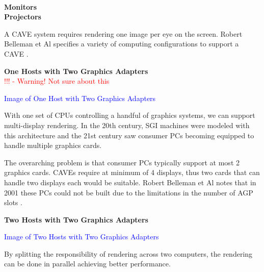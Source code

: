\label{chapter:standardCAVEChapter}


\filbreak
{} \\

\filbreak
\noindent\textbf{Monitors}\\

\filbreak
\noindent\textbf{Projectors}\\

\filbreak
{}

A CAVE system requires rendering one image per eye on the screen. Robert Belleman et Al specifies a variety of computing configurations to support a CAVE \cite{belleman}.

\filbreak
\noindent\textbf{One Hosts with Two Graphics Adapters}\\
\textcolor{red}{!!! - Warning! Not sure about this}
\begin{center}
	\textcolor{blue}{Image of One Host with Two Graphics Adapters}
\end{center}

With one set of CPUs controlling a handful of graphics systems, we can support multi-display rendering. In the 20th century, SGI machines were modeled with this architecture and the  21st century saw consumer PCs becoming equipped to handle multiple graphics cards. 

The overarching problem is that consumer PCs typically support at most 2 graphics cards. CAVEs require at minimum of 4 displays, thus two cards that can handle two displays each would be suitable. Robert Belleman et Al notes that in 2001 these PCs could not be built due to the limitations in the number of AGP slots \cite{belleman}.

\filbreak
\noindent\textbf{Two Hosts with Two Graphics Adapters}\\
\begin{center}
	\textcolor{blue}{Image of Two Hosts with Two Graphics Adapters}
\end{center}

By splitting the responsibility of rendering across two computers, the rendering can be done in parallel achieving better performance. 

